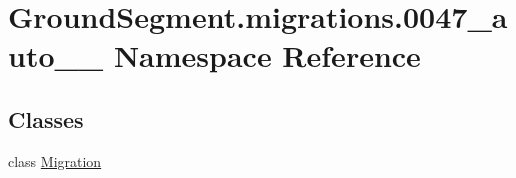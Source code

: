 \hypertarget{namespace_ground_segment_1_1migrations_1_10047__auto__20170207__1238}{}\section{Ground\+Segment.\+migrations.0047\+\_\+auto\+\_\+\_ Namespace Reference}
\label{namespace_ground_segment_1_1migrations_1_10047__auto__20170207__1238}
\subsection*{Classes}
\begin{DoxyCompactItemize}
\item 
class \hyperlink{class_ground_segment_1_1migrations_1_10047__auto__20170207__1238_1_1_migration}{Migration}
\end{DoxyCompactItemize}

